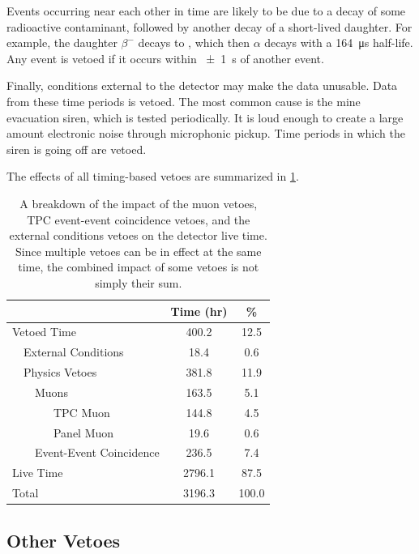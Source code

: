 \documentclass[herrin-thesis.tex]{subfiles}
\begin{document}
Events occurring near each other in time are likely to be due to a decay of some radioactive contaminant, followed by another decay of a short-lived daughter. For example, the  daughter  \(\beta^{-}\) decays to , which then \(\alpha\) decays with a \SI{164}{\micro\s} half-life.  Any event is vetoed if it occurs within \SI{\pm1}{\s} of another event.

Finally, conditions external to the detector may make the data unusable. Data from these time periods is vetoed. The most common cause is the mine evacuation siren, which is tested periodically. It is loud enough to create a large amount electronic noise through microphonic pickup. Time periods in which the siren is going off are vetoed.

The effects of all timing-based vetoes are summarized in \cref{tab:analysis_veto_effects}.

\begin{table}[htb]
\centering
\caption[Impact of timing-based vetoes]{A breakdown of the impact of the muon vetoes, TPC event-event coincidence vetoes, and the external conditions vetoes on the detector live time. Since multiple vetoes can be in effect at the same time, the combined impact of some vetoes is not simply their sum.}
\label{tab:analysis_veto_effects}
\begin{tabular}{l l l l c c}\toprule
\multicolumn{4}{c}{}							&	Time (\si{hr})	&	\%	\\\midrule
\multicolumn{4}{l}{Vetoed Time}				&	400.2		&	12.5	\\
	&\multicolumn{3}{l}{External Conditions}		&	18.4			&	0.6	\\
	&\multicolumn{3}{l}{Physics Vetoes}			&	381.8		&	11.9	\\
	&&\multicolumn{2}{l}{Muons}				&	163.5		&	5.1	\\
	&&&TPC Muon							&	144.8		&	4.5	\\
	&&&Panel Muon						&	19.6			&	0.6	\\
	&&\multicolumn{2}{l}{Event-Event Coincidence}&	236.5		&	7.4	\\
\multicolumn{4}{l}{Live Time}					&	2796.1		&	87.5	\\\midrule
\multicolumn{4}{l}{Total}						&	3196.3		&	100.0\\\bottomrule
\end{tabular}
\end{table}

\subsection{Other Vetoes}
\end{document}
